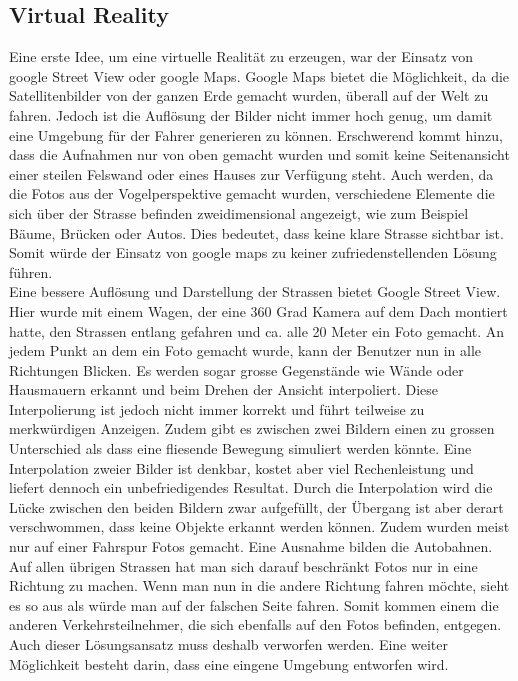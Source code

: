 \subsection{Virtual Reality}
Eine erste Idee, um eine virtuelle Realität zu erzeugen, war der Einsatz von google Street View oder google Maps. Google Maps bietet die Möglichkeit, da die Satellitenbilder von der ganzen Erde gemacht wurden, überall auf der Welt zu fahren. Jedoch ist die Auflösung der Bilder nicht immer hoch genug, um damit eine Umgebung für der Fahrer generieren zu können. Erschwerend kommt hinzu, dass die Aufnahmen nur von oben gemacht wurden und somit keine Seitenansicht einer steilen Felswand oder eines Hauses zur Verfügung steht. Auch werden, da die Fotos aus der Vogelperspektive gemacht wurden, verschiedene Elemente die sich über der Strasse befinden zweidimensional angezeigt, wie zum Beispiel Bäume, Brücken oder Autos. Dies bedeutet, dass keine klare Strasse sichtbar ist. Somit würde der Einsatz von google maps zu keiner zufriedenstellenden Lösung führen. \\
Eine bessere Auflösung und Darstellung der Strassen bietet Google Street View. Hier wurde mit einem Wagen, der eine 360 Grad Kamera auf dem Dach montiert hatte, den Strassen entlang gefahren und ca. alle 20 Meter ein Foto gemacht. An jedem Punkt an dem ein Foto gemacht wurde, kann der Benutzer nun in alle Richtungen Blicken. Es werden sogar grosse Gegenstände wie Wände oder Hausmauern erkannt und beim Drehen der Ansicht interpoliert. Diese Interpolierung ist jedoch nicht immer korrekt und führt teilweise zu merkwürdigen Anzeigen. Zudem gibt es zwischen zwei Bildern einen zu grossen Unterschied als dass eine fliesende Bewegung simuliert werden könnte. Eine Interpolation zweier Bilder ist denkbar, kostet aber viel Rechenleistung und liefert dennoch ein unbefriedigendes Resultat. Durch die Interpolation wird die Lücke zwischen den beiden Bildern zwar aufgefüllt, der Übergang ist aber derart verschwommen, dass keine Objekte erkannt werden können. 
Zudem wurden meist nur auf einer Fahrspur Fotos gemacht. Eine Ausnahme bilden die Autobahnen. Auf allen übrigen Strassen hat man sich darauf beschränkt Fotos nur in eine Richtung zu machen. Wenn man nun in die andere Richtung fahren möchte, sieht es so aus als würde man auf der falschen Seite fahren. Somit kommen einem die anderen Verkehrsteilnehmer, die sich ebenfalls auf den Fotos befinden, entgegen. Auch dieser Lösungsansatz muss deshalb verworfen werden. Eine weiter Möglichkeit besteht darin, dass eine eingene Umgebung entworfen wird.\\
